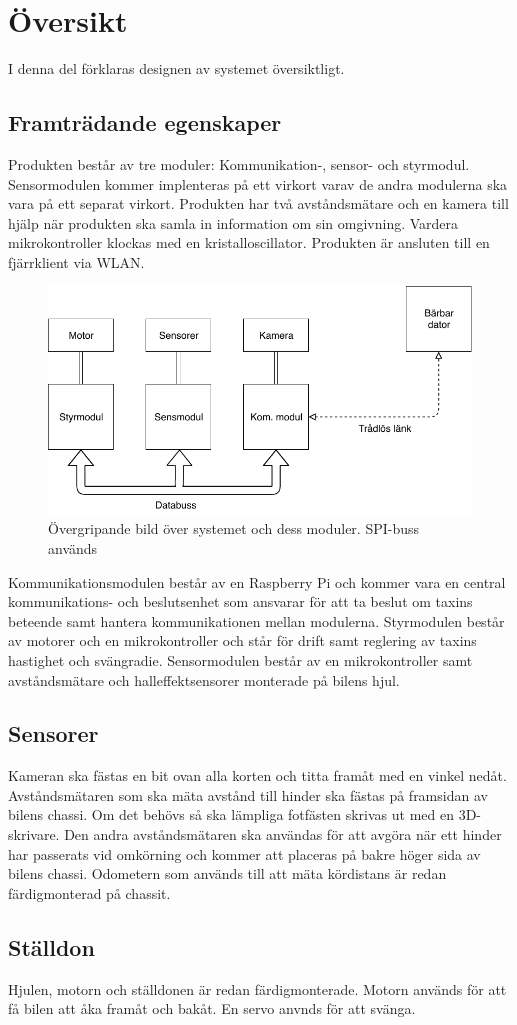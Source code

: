 \documentclass[designspec/spec.tex]{subfiles}
\begin{document}
\section{Översikt}
I denna del förklaras designen av systemet översiktligt.

\subsection{Framträdande egenskaper}
Produkten består av tre moduler: Kommunikation-, sensor- och styrmodul.
Sensormodulen kommer implenteras på ett virkort varav de andra modulerna ska
vara på ett separat virkort. Produkten har två avståndsmätare och en kamera
till hjälp när produkten ska samla in information om sin omgivning. Vardera
mikrokontroller klockas med en kristalloscillator. Produkten är ansluten till en
fjärrklient via WLAN.

\begin{figure}[h]
    \centering
    \includegraphics[width=0.6\linewidth]{designspec/fig/blockskiss.pdf}
    \caption{Övergripande bild över systemet och dess moduler. SPI-buss används}
    \label{fig:overview}
\end{figure}

\noindent
Kommunikationsmodulen består av en Raspberry Pi och kommer vara en central
kommun\-ikations- och beslutsenhet som ansvarar för att ta beslut om taxins
beteende samt hantera kommunikationen mellan modulerna. Styrmodulen består av
motorer och en mikrokontroller och står för drift samt reglering av taxins
hastighet och svängradie. Sensormodulen består av en mikrokontroller samt
avståndsmätare och halleffektsensorer monterade på bilens hjul.

\subsection{Sensorer}
Kameran ska fästas en bit ovan alla korten och titta framåt med en vinkel
nedåt. Avståndsmätaren som ska mäta avstånd till hinder ska fästas på framsidan
av bilens chassi. Om det behövs så ska lämpliga fotfästen skrivas ut med en
3D-skrivare. Den andra avståndsmätaren ska användas för att avgöra när ett
hinder har passerats vid omkörning och kommer att placeras på bakre höger sida
av bilens chassi. Odometern som används till att mäta kördistans är redan
färdigmonterad på chassit.

\subsection{Ställdon}
Hjulen, motorn och ställdonen är redan färdigmonterade. Motorn används
för att få bilen att åka framåt och bakåt. En servo anvnds för att svänga.
\end{document}
